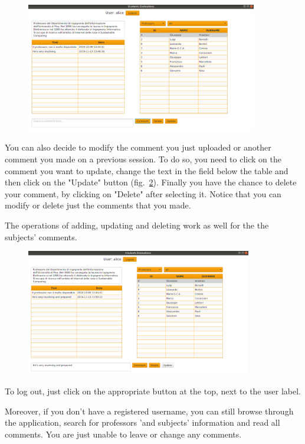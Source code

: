 \documentclass[a4paper]{article}
\begin{document}
\begin{figure}
\centering
\includegraphics[width=0.9\textwidth]{images/screens/screen4}
\label{fig:screen4}
\end{figure}

You can also decide to modify the comment you just uploaded or another comment you made on a previous session. To do so, you need to click on the comment you want to update, change the text in the field below the table and then click on the "Update" button (fig.~\ref{fig:screen5}).
Finally you have the chance to delete your comment, by clicking on "Delete" after selecting it. Notice that you can modify or delete just the comments that you made.

The operations of adding, updating and deleting work as well for the the subjects' comments.
\begin{figure}[h]
\centering
\includegraphics[width=0.88\textwidth]{images/screens/screen5}
\label{fig:screen5}
\end{figure}

To log out, just click on the appropriate button at the top, next to the user label.

Moreover, if you don't have a registered username, you can still browse through the application, search for professors 'and subjects' information and read all comments. You are just unable to leave or change any comments.
\end{document}
